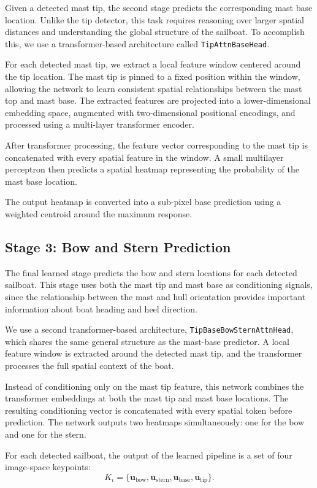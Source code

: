 Given a detected mast tip, the second stage predicts the corresponding mast base location. Unlike the tip detector, this task requires reasoning over larger spatial distances and understanding the global structure of the sailboat. To accomplish this, we use a transformer-based architecture called \texttt{TipAttnBaseHead}.

For each detected mast tip, we extract a local feature window centered around the tip location. The mast tip is pinned to a fixed position within the window, allowing the network to learn consistent spatial relationships between the mast top and mast base. The extracted features are projected into a lower-dimensional embedding space, augmented with two-dimensional positional encodings, and processed using a multi-layer transformer encoder.

After transformer processing, the feature vector corresponding to the mast tip is concatenated with every spatial feature in the window. A small multilayer perceptron then predicts a spatial heatmap representing the probability of the mast base location.

The output heatmap is converted into a sub-pixel base prediction using a weighted centroid around the maximum response.

\subsection{Stage 3: Bow and Stern Prediction}

The final learned stage predicts the bow and stern locations for each detected sailboat. This stage uses both the mast tip and mast base as conditioning signals, since the relationship between the mast and hull orientation provides important information about boat heading and heel direction.

We use a second transformer-based architecture, \texttt{TipBaseBowSternAttnHead}, which shares the same general structure as the mast-base predictor. A local feature window is extracted around the detected mast tip, and the transformer processes the full spatial context of the boat.

Instead of conditioning only on the mast tip feature, this network combines the transformer embeddings at both the mast tip and mast base locations. The resulting conditioning vector is concatenated with every spatial token before prediction. The network outputs two heatmaps simultaneously: one for the bow and one for the stern.

For each detected sailboat, the output of the learned pipeline is a set of four image-space keypoints:
\begin{equation}
K_i = \{ \mathbf{u}_{\text{bow}}, \mathbf{u}_{\text{stern}}, \mathbf{u}_{\text{base}}, \mathbf{u}_{\text{tip}} \}.
\end{equation}

